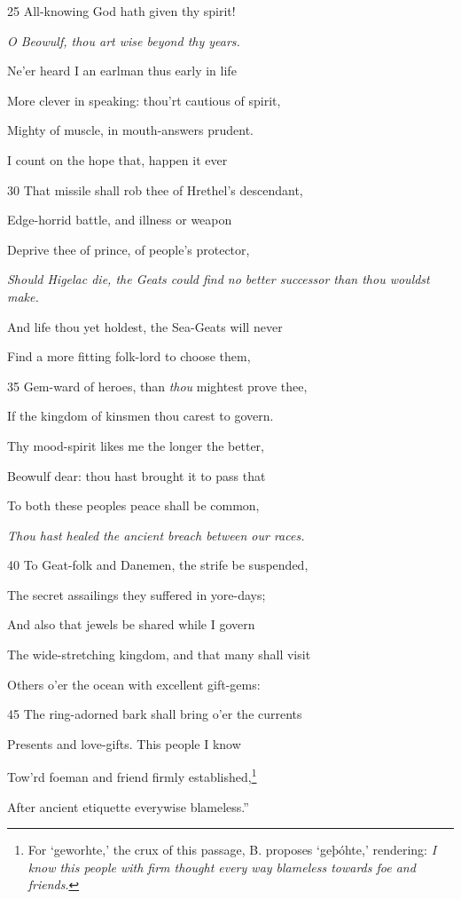 25
All-knowing God hath given thy spirit!

\emph{O Beowulf, thou
art wise beyond
thy years.}

Ne’er heard I an earlman thus early in life

More clever in speaking: thou’rt cautious of spirit,

Mighty of muscle, in mouth-answers prudent.

I count on the hope that, happen it ever

30
That missile shall rob thee of Hrethel’s descendant,

Edge-horrid battle, and illness or weapon

Deprive thee of prince, of people’s protector,

\emph{Should Higelac
die, the Geats
could find no better
successor than
thou wouldst make.}

And life thou yet holdest, the Sea-Geats will never

Find a more fitting folk-lord to choose them,

35
Gem-ward of heroes, than \emph{thou} mightest prove thee,

If the kingdom of kinsmen thou carest to govern.

Thy mood-spirit likes me the longer the better,

Beowulf dear: thou hast brought it to pass that

To both these peoples peace shall be common,

\emph{Thou hast healed
the ancient breach
between our races.}

40
To Geat-folk and Danemen, the strife be suspended,

The secret assailings they suffered in yore-days;

And also that jewels be shared while I govern

The wide-stretching kingdom, and that many shall visit

Others o’er the ocean with excellent gift-gems:

45
The ring-adorned bark shall bring o’er the currents

Presents and love-gifts. This people I know

Tow’rd foeman and friend firmly established,\footnote{For ‘geworhte,’ the crux of this passage, B. proposes ‘geþóhte,’ rendering:
\emph{I know this people with firm thought every way blameless towards foe and
friends}.}

After ancient etiquette everywise blameless.”


